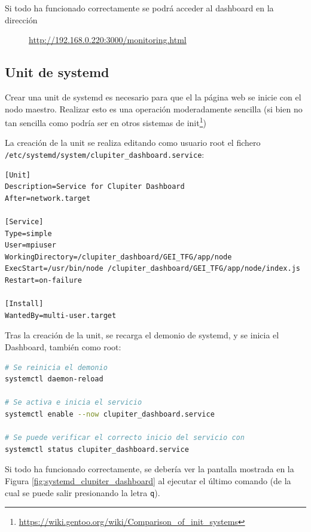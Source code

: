 Si todo ha funcionado correctamente se podrá acceder al dashboard en la dirección

\begin{figure}[H]
    \vspace{0.2cm}
    \centering
    \url{http://192.168.0.220:3000/monitoring.html}
\end{figure}


\subsection{Unit de systemd}
Crear una unit de systemd es necesario para que el la página web se inicie con el nodo maestro. Realizar esto es una operación moderadamente sencilla (si bien no tan sencilla como podría ser en otros sistemas de init\footnote{\url{https://wiki.gentoo.org/wiki/Comparison_of_init_systems}}) 

La creación de la unit se realiza editando como usuario root el fichero \texttt{/etc/systemd/system/clupiter\_dashboard.service}:

\begin{lstlisting}[]
[Unit]
Description=Service for Clupiter Dashboard
After=network.target

[Service]
Type=simple
User=mpiuser
WorkingDirectory=/clupiter_dashboard/GEI_TFG/app/node
ExecStart=/usr/bin/node /clupiter_dashboard/GEI_TFG/app/node/index.js
Restart=on-failure

[Install]
WantedBy=multi-user.target
\end{lstlisting}

Tras la creación de la unit, se recarga el demonio de systemd, y se inicia el Dashboard, también como root:
\begin{lstlisting}[language=bash]
# Se reinicia el demonio
systemctl daemon-reload

# Se activa e inicia el servicio
systemctl enable --now clupiter_dashboard.service

# Se puede verificar el correcto inicio del servicio con
systemctl status clupiter_dashboard.service
\end{lstlisting}

Si todo ha funcionado correctamente, se debería ver la pantalla mostrada en la Figura \ref{fig:systemd_clupiter_dashboard} al ejecutar el último comando (de la cual se puede salir presionando la letra \texttt{q}).

